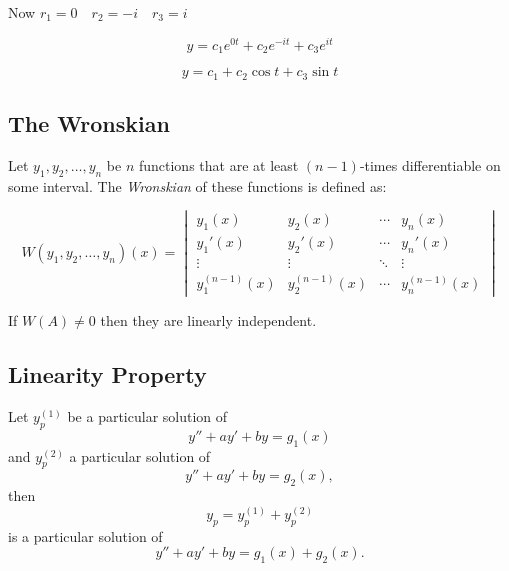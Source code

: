 Now \(r_1 = 0 \quad r_2 = -i \quad r_3 = i\)

\[y = c_1 e^{0t} + c_2 e^{-it} + c_3 e^{it}\]

\[y = c_1 + c_2 \cos t + c_3 \sin t\]

\subsection{The Wronskian}

Let \( y_1, y_2, \ldots, y_n \) be \( n \) functions that are at least 
\( (n-1) \)-times differentiable on some interval. The \emph{Wronskian} of these 
functions is defined as:

\[
W(y_1, y_2, \ldots, y_n)(x) =
\begin{vmatrix}
y_1(x) & y_2(x) & \cdots & y_n(x) \\
y_1'(x) & y_2'(x) & \cdots & y_n'(x) \\
\vdots & \vdots & \ddots & \vdots \\
y_1^{(n-1)}(x) & y_2^{(n-1)}(x) & \cdots & y_n^{(n-1)}(x)
\end{vmatrix}
\]

If \(W(A) \ne 0\) then they are linearly independent.


\subsection{Linearity Property}

Let \( y_p^{(1)} \) be a particular solution of  
\[
y'' + ay' + by = g_1(x)
\]  
and \( y_p^{(2)} \) a particular solution of  
\[
y'' + ay' + by = g_2(x),
\]  
then  
\[
y_p = y_p^{(1)} + y_p^{(2)}
\]  
is a particular solution of  
\[
y'' + ay' + by = g_1(x) + g_2(x).
\]  

